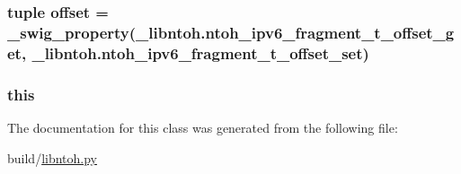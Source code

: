 \hypertarget{classlibntoh_1_1ntoh__ipv6__fragment__t_a03fbaceb13719d1bc975d26c3b92761a}{
\subsubsection[{offset}]{\setlength{\rightskip}{0pt plus 5cm}tuple offset = {\bf \-\_\-swig\-\_\-property}(\-\_\-libntoh.\-ntoh\-\_\-ipv6\-\_\-fragment\-\_\-t\-\_\-offset\-\_\-get, \-\_\-libntoh.\-ntoh\-\_\-ipv6\-\_\-fragment\-\_\-t\-\_\-offset\-\_\-set)\hspace{0.3cm}{\ttfamily [static]}}}\label{classlibntoh_1_1ntoh__ipv6__fragment__t_a03fbaceb13719d1bc975d26c3b92761a}
\hypertarget{classlibntoh_1_1ntoh__ipv6__fragment__t_a05c09a5e9d53fa7adf0a7936038c2fa3}{
\subsubsection[{this}]{\setlength{\rightskip}{0pt plus 5cm}this}}\label{classlibntoh_1_1ntoh__ipv6__fragment__t_a05c09a5e9d53fa7adf0a7936038c2fa3}


The documentation for this class was generated from the following file\-:\begin{DoxyCompactItemize}
\item 
build/\hyperlink{libntoh_8py}{libntoh.\-py}\end{DoxyCompactItemize}
